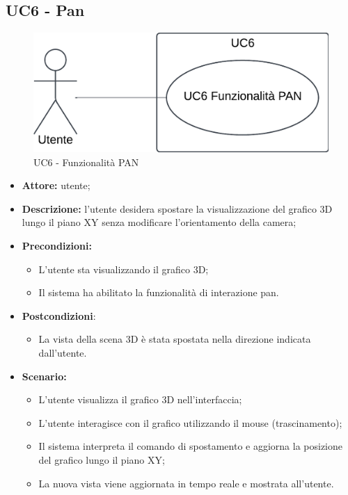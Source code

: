 \subsection{UC6 - Pan}
\begin{figure}[h!]
    \centering
    \includegraphics[scale=0.7]{template/images/UC6.png}
    \caption{UC6 - Funzionalità PAN}
\end{figure}
\begin{itemize}
    \item \textbf{Attore:} utente;
    \item \textbf{Descrizione:} l'utente desidera spostare la visualizzazione del grafico 3D lungo il piano XY senza modificare l'orientamento della camera;
    \item \textbf{Precondizioni:}
    \begin{itemize}
        \item L'utente sta visualizzando il grafico 3D;
        \item Il sistema ha abilitato la funzionalità di interazione pan.
    \end{itemize}
    \item \textbf{Postcondizioni}:
    \begin{itemize}
        \item La vista della scena 3D è stata spostata nella direzione indicata dall'utente.
    \end{itemize}
    \item \textbf{Scenario:}
    \begin{itemize}
        \item L'utente visualizza il grafico 3D nell'interfaccia;
        \item L'utente interagisce con il grafico utilizzando il mouse (trascinamento);
        \item Il sistema interpreta il comando di spostamento e aggiorna la posizione del grafico lungo il piano XY;
        \item La nuova vista viene aggiornata in tempo reale e mostrata all'utente.
    \end{itemize}
\end{itemize}

